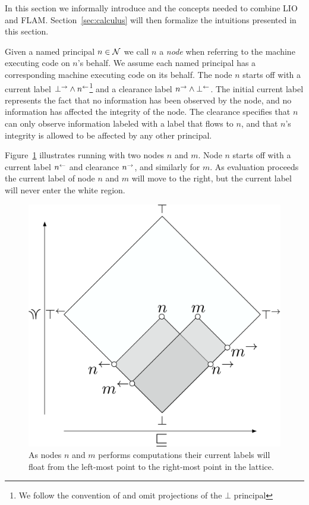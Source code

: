In this section we informally introduce \lang{} and the concepts needed to combine LIO and FLAM. Section~\ref{sec:calculus} will then formalize the intuitions presented in this section.

Given a named principal $n \in \mathcal{N}$ we call $n$ a \emph{node} when referring to the machine executing code on $n$'s behalf. We assume each named principal has a corresponding machine executing code on its behalf. The node $n$ starts off with a current label $\bot^{\rightarrow} \wedge n^{\leftarrow}$\footnote{We follow the convention of \cite{Arden:2015:FA:2859845.2859998} and omit projections of the $\bot$ principal} and a clearance label $n^{\rightarrow} \wedge \bot^{\leftarrow}$. The initial current label represents the fact that no information has been observed by the node, and no information has affected the integrity of the node. The clearance specifies that $n$ can only observe information labeled with a label that flows to $n$, and that $n$'s integrity is allowed to be affected by any other principal.

Figure~\ref{fig:node-info-flow} illustrates running \lang{} with two nodes $n$ and $m$. Node $n$ starts off with a current label $n^{\leftarrow}$ and clearance $n^{\rightarrow}$, and similarly for $m$. As evaluation proceeds the current label of node $n$ and $m$ will move to the right, but the current label will never enter the white region.

\begin{figure}
    \centering
    \includegraphics[scale=0.25]{Illustrations/multi-node.pdf}
    \caption{As nodes $n$ and $m$ performs computations their current labels will float from the left-most point to the right-most point in the lattice.}
    \label{fig:node-info-flow}
\end{figure}

